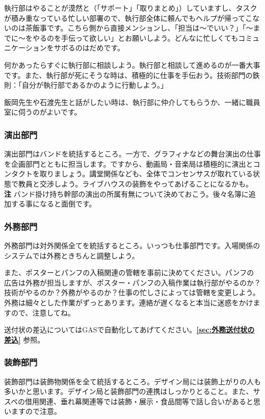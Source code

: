 \documentclass[dvipdfmx,jb5]{jarticle}
\begin{document}
執行部はやることが漠然と（「サポート」「取りまとめ」）していますし、タスクが積み重なっている忙しい部署ので、執行部全体に頼んでもヘルプが帰ってこないのは茶飯事です。こちら側から直接メンションし、「担当は〜でいい？」「〜までに〜をやるのを手伝って欲しい」とお願いしよう。どんなに忙しくてもコミュニケーションをサボるのはだめです。

何かあったらすぐに執行部に相談しよう。執行部と相談して進めるのが一番大事です。また、執行部が死にそうな時は、積極的に仕事を手伝おう。技術部門の鉄則：「自分が執行部であるかのように行動しよう。」

飯岡先生や石渡先生と話がしたい時は、執行部に仲介してもらうか、一緒に職員室に伺うのがよいです。

\subsubsection{演出部門}\label{sec:演出部門}
演出部門はバンドを統括するところ。一方で、グラフィナなどの舞台演出の仕事を企画部門とともに担当します。ですから、動画局・音楽局は積極的に演出とコンタクトを取りましょう。講堂関係なども、全体でコンセンサスが取れている状態で教員と交渉しよう。ライブハウスの装飾をやってあげることになるかも。\\
{\bf 注} バンド掛け持ち幹部の演出の所属有無について決めておこう。後々名簿に追加する事になると面倒です。

\subsubsection{外務部門}
外務部門は対外関係全てを統括するところ。いっつも仕事部門です。入場関係のシステムでは外務ときちんと調整しよう。

また、ポスターとパンフの入稿関連の管轄を事前に決めてください。パンフの広告は外務が担当しますが、ポスター・パンフの入稿作業は執行部がやるのか？技術がやるのか？外務がやるのか？仕事の忙しさによっては管轄を変更しよう。外務は細々とした作業がずっとあります。連絡が遅くなると本当に迷惑をかけますので、注意してね。

送付状の差込についてはGASで自動化してあげてください。{\bf \ref{sec:外務送付状の差込}} 参照。

\subsubsection{装飾部門}
装飾部門は装飾物関係を全て統括するところ。デザイン局には装飾上がりの人も多いかと思います。デザイン局と装飾部門の連携はしっかりとること。また、サスペの借用関連、垂れ幕関連等では装飾・展示・食品間等で話し合いがあると思いますので注意。
\end{document}
